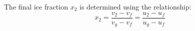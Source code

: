 The final ice fraction \( x_2 \) is determined using the relationship:  
\[
x_2 = \frac{v_2 - v_f}{v_g - v_f} = \frac{u_2 - u_f}{u_g - u_f}
\]